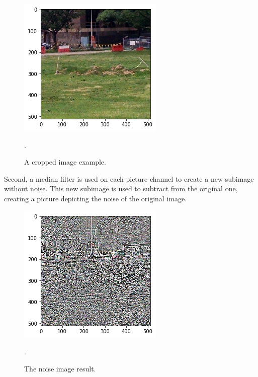 \documentclass[10pt,twocolumn,letterpaper]{article}
\begin{document}
\begin{figure}[!ht]
\begin{center}
	\includegraphics[width=0.99\columnwidth]{pics/original}
	\caption{A cropped image example.}.\label{fig:label}  
\end{center} 
\end{figure}   

Second, a median filter is used on each picture channel to create a new subimage without noise. This new subimage is used to subtract from the original one, creating a picture depicting the noise of the original image.

\begin{figure}[!ht]
\begin{center}
	\includegraphics[width=0.99\columnwidth]{pics/noise}
	\caption{The noise image result.}.\label{fig:label}  
\end{center} 
\end{figure}   
\end{document}
